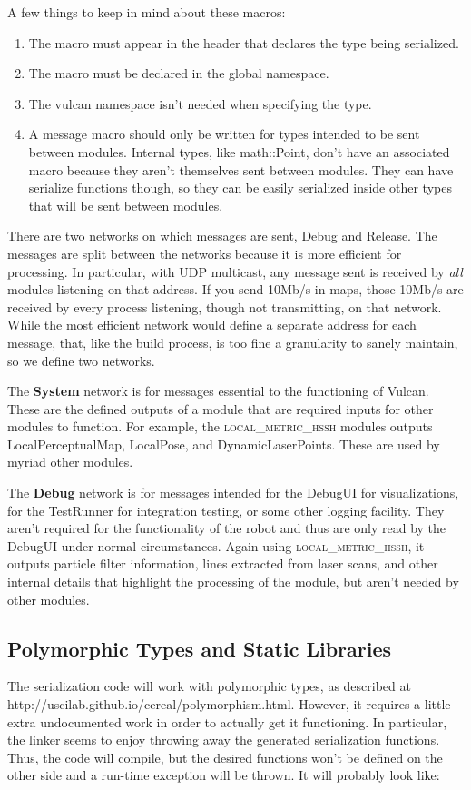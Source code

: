 \documentclass{article}
\begin{document}
A few things to keep in mind about these macros:

\begin{enumerate}
 \item The macro must appear in the header that declares the type being serialized. 
 \item The macro must be declared in the global namespace.
 \item The vulcan namespace isn't needed when specifying the type.
 \item A message macro should only be written for types intended to be sent between modules. Internal types, like 
  math::Point, don't have an associated macro because they aren't themselves sent between modules. They can have 
  serialize functions though, so they can be easily serialized inside other types that will be sent between modules.
\end{enumerate}

There are two networks on which messages are sent, Debug and Release. The messages are split between the networks 
because it is more efficient for processing. In particular, with UDP multicast, any message sent is received by 
\emph{all} modules listening on that address. If you send 10Mb/s in maps, those 10Mb/s are received by every process 
listening, though not transmitting, on that network. While the most efficient network would define a separate address 
for each message, that, like the build process, is too fine a granularity to sanely maintain, so we define two networks.

The \textbf{System} network is for messages essential to the functioning of Vulcan. These are the defined outputs of a 
module that are required inputs for other modules to function. For example, the \textsc{local\_metric\_hssh} modules 
outputs LocalPerceptualMap, LocalPose, and DynamicLaserPoints. These are used by myriad other modules. 

The \textbf{Debug} network is for messages intended for the DebugUI for visualizations, for the TestRunner for 
integration testing, or some other logging facility. They aren't required for the functionality of the robot and thus 
are only read by the DebugUI under normal circumstances. Again using \textsc{local\_metric\_hssh}, it outputs particle 
filter information, lines extracted from laser scans, and other internal details that highlight the processing of the 
module, but aren't needed by other modules.

\subsection{Polymorphic Types and Static Libraries}
The serialization code will work with polymorphic types, as described at \\ 
http://uscilab.github.io/cereal/polymorphism.html. However, it requires a little extra undocumented work in order to 
actually get it functioning. In particular, the linker seems to enjoy throwing away the generated serialization 
functions. Thus, the code will compile, but the desired functions won't be defined on the other side and a run-time 
exception will be thrown. It will probably look like:
\end{document}
